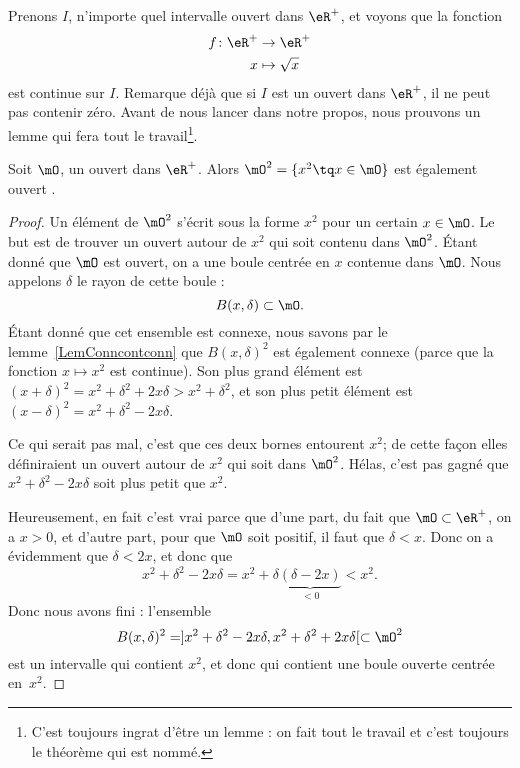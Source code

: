 Prenons $I$, n'importe quel intervalle ouvert dans $\eR^+$, et voyons que la fonction
\begin{equation}
\begin{aligned}
 f\colon \eR^+&\to \eR^+ \\
   x&\mapsto \sqrt{x}
\end{aligned}
\end{equation}
est continue sur $I$. Remarque déjà que si $I$ est un ouvert dans $\eR^+$, il ne peut pas contenir zéro. Avant de nous lancer dans notre propos, nous prouvons un lemme qui fera tout le travail\footnote{C'est toujours ingrat d'être un lemme : on fait tout le travail et c'est toujours le théorème qui est nommé.}.

\begin{lemma}
Soit $\mO$, un ouvert dans $\eR^+$. Alors $\mO^2=\{ x^2\tq x\in\mO \}$ est également ouvert .
\end{lemma}

\begin{proof}
Un élément de $\mO^2$ s'écrit sous la forme $x^2$ pour un certain $x\in\mO$. Le but est de trouver un ouvert autour de $x^2$ qui soit contenu dans $\mO^2$. Étant donné que $\mO$ est ouvert, on a une boule centrée en $x$ contenue dans $\mO$. Nous appelons $\delta$ le rayon de cette boule :
\[
  B(x,\delta)\subset\mO.
\]
Étant donné que cet ensemble est connexe, nous savons par le lemme~\ref{LemConncontconn} que $B(x,\delta)^2$ est également connexe (parce que la fonction $x\mapsto x^2$ est continue). Son plus grand élément est $(x+\delta)^2=x^2+\delta^2+2x\delta>x^2+\delta^2$, et son plus petit élément est $(x-\delta)^2=x^2+\delta^2-2x\delta$.

Ce qui serait pas mal, c'est que ces deux bornes entourent $x^2$; de cette façon elles définiraient un ouvert autour de $x^2$ qui soit dans $\mO^2$. Hélas, c'est pas gagné que $x^2+\delta^2-2x\delta$ soit plus petit que $x^2$.

Heureusement, en fait c'est vrai parce que d'une part, du fait que $\mO\subset\eR^+$, on a $x>0$, et d'autre part, pour que $\mO$ soit positif, il faut que $\delta<x$. Donc on a évidemment que $\delta<2x$, et donc que
\[
  x^2+\delta^2-2x\delta=x^2+\delta\underbrace{(\delta-2x)}_{<0}<x^2.
\]
Donc nous avons fini : l'ensemble
\[
  B(x,\delta)^2=]x^2+\delta^2-2x\delta,x^2+\delta^2+2x\delta[\subset\mO^2
\]
est un intervalle qui contient $x^2$, et donc qui contient une boule ouverte centrée en~$x^2$.

\end{proof}

